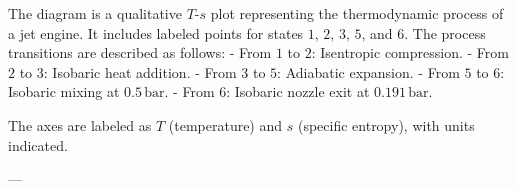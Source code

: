The diagram is a qualitative \( T \)-\( s \) plot representing the thermodynamic process of a jet engine. It includes labeled points for states \( 1 \), \( 2 \), \( 3 \), \( 5 \), and \( 6 \). The process transitions are described as follows:  
- From \( 1 \) to \( 2 \): Isentropic compression.  
- From \( 2 \) to \( 3 \): Isobaric heat addition.  
- From \( 3 \) to \( 5 \): Adiabatic expansion.  
- From \( 5 \) to \( 6 \): Isobaric mixing at \( 0.5 \, \text{bar} \).  
- From \( 6 \): Isobaric nozzle exit at \( 0.191 \, \text{bar} \).  

The axes are labeled as \( T \) (temperature) and \( s \) (specific entropy), with units indicated.  

---